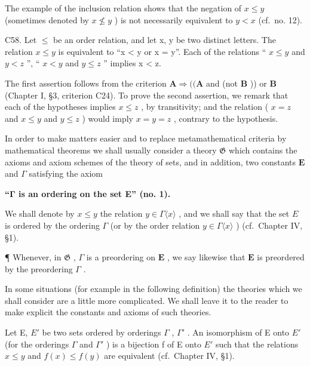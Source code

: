 The example of the inclusion relation shows that the negation of \(x \leqslant y\) (sometimes denoted by \(x \nleqslant y\) ) is not necessarily equivalent to \(y < x\) (cf.~no. 12).

C58. Let \(\leqslant\) be an order relation, and let x, y be two distinct letters. The relation \(x \leqslant y\) is equivalent to ``x \textless{} y or x = y''. Each of the relations `` \(x \leqslant y\) and \(y < z\) '', `` \(x < y\) and \(y \leqslant z\) '' implies x \textless{} z.

The first assertion follows from the criterion \(\mathbf{A} \Longrightarrow ((\mathbf{A}\) and (not \(\mathbf{B}\) )) or \(\mathbf{B}\) (Chapter I, §3, criterion C24). To prove the second assertion, we remark that each of the hypotheses implies \(x \leqslant z\) , by transitivity; and the relation ( \(x = z\) and \(x \leqslant y\) and \(y \leqslant z\) ) would imply \(x = y = z\) , contrary to the hypothesis.

In order to make matters easier and to replace metamathematical criteria by mathematical theorems we shall usually consider a theory \(\mathfrak{G}\) which contains the axioms and axiom schemes of the theory of sets, and in addition, two constants \(\mathbf{E}\) and \(\Gamma\) satisfying the axiom

\textbf{``Γ is an ordering on the set E'' (no. 1).}

We shall denote by \(x \leqslant y\) the relation \(y \in \Gamma \langle x \rangle\) , and we shall say that the set \(E\) is ordered by the ordering \(\Gamma\) (or by the order relation \(y \in \Gamma \langle x \rangle\) ) (cf.~Chapter IV, §1).

¶ Whenever, in \(\mathfrak{G}\) , \(\Gamma\) is a preordering on \(\mathbf{E}\) , we say likewise that \(\mathbf{E}\) is preordered by the preordering \(\Gamma\) .

In some situations (for example in the following definition) the theories which we shall consider are a little more complicated. We shall leave it to the reader to make explicit the constants and axioms of such theories.

Let E, \(E'\) be two sets ordered by orderings \(\Gamma\) , \(\Gamma'\) . An isomorphism of E onto \(E'\) (for the orderings \(\Gamma\) and \(\Gamma'\) ) is a bijection f of E onto \(E'\) such that the relations \(x \leqslant y\) and \(f(x) \leqslant f(y)\) are equivalent (cf.~Chapter IV, §1).

